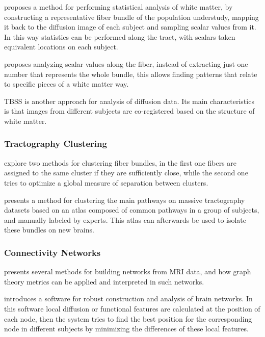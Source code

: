 \autocite{goodlett_group_2008} proposes a method for performing statistical analysis of white matter, by constructing a representative fiber bundle of the population understudy, mapping it back to the diffusion image of each subject and sampling scalar values from it. In this way statistics can be performed along the tract, with scalars taken equivalent locations on each subject.

\autocite{colby_along-tract_2011} proposes analyzing scalar values along the fiber, instead of extracting just one number that represents the whole bundle, this allows finding patterns that relate to specific pieces of a white matter way.


TBSS \autocite{smith_tract-based_2006} is another approach for analysis of diffusion data. Its main characteristics is that images from different subjects are co-registered based on the structure of white matter. 

\subsubsection{Tractography Clustering}

\autocite{song_zhang_identifying_2008} explore two methods for clustering fiber bundles, in the first one fibers are assigned to the same cluster if they are sufficiently close, while the second one tries to optimize a global measure of separation between clusters.

\autocite{guevara_automatic_2012} presents a method for clustering the main pathways on massive tractography datasets based on an atlas composed of common pathways in a group of subjects, and manually labeled by experts. This atlas can afterwards be used to isolate these bundles on new brains.

\subsubsection{Connectivity Networks}

\autocite{rubinov_complex_2010} presents several methods for building networks from MRI data, and how graph theory metrics can be applied and interpreted in such networks.

\autocite{li_visual_2012} introduces a software for robust construction and analysis of brain networks. In this software local diffusion or functional features are calculated at the position of each node, then the system tries to find the best position for the corresponding node in different subjects by minimizing the differences of these local features.

